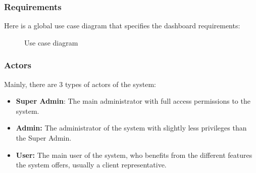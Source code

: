 \subsubsection{Requirements}
Here is a global use case diagram that specifies the dashboard requirements:
\begin{figure}[H]
	\centering
	\caption{Use case diagram}
	\label{fig:use-case-diagram}
\end{figure}

\subsubsection{Actors}
Mainly, there are 3 types of actors of the system:
\begin{itemize}
	\item \textbf{Super Admin}: The main administrator with full access permissions to the system.
	\item \textbf{Admin:} The administrator of the system with slightly less privileges than the Super Admin.
	\item \textbf{User:} The main user of the system, who benefits from the different features the system offers, usually a client representative.
\end{itemize}

